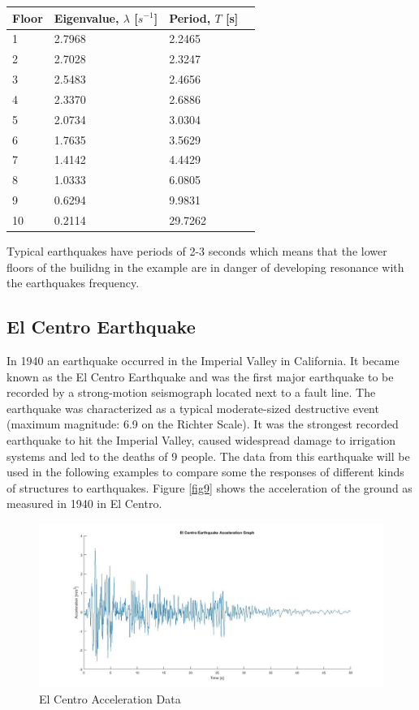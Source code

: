 \documentclass{article}
\begin{document}
				\begin{center}
    					\begin{tabular}{| l | l | l | l |}
    \hline
    Floor & Eigenvalue, $\lambda$ [$s^{-1}$] & Period, $T$ [s] \\ \hline
    1 & 2.7968 & 2.2465 \\ \hline
    2 & 2.7028 & 2.3247 \\ \hline
    3 & 2.5483 & 2.4656 \\ \hline
    4 & 2.3370 & 2.6886 \\ \hline
    5 & 2.0734 & 3.0304 \\ \hline
    6 & 1.7635 & 3.5629 \\ \hline
    7 & 1.4142 & 4.4429 \\ \hline
    8 & 1.0333 & 6.0805 \\ \hline
    9 & 0.6294 & 9.9831 \\ \hline
   10 & 0.2114 & 29.7262 \\ \hline
   					 \end{tabular}
				\end{center}
Typical earthquakes have periods of 2-3 seconds which means that the lower floors of the builidng in the example are in danger of developing resonance with the earthquakes frequency. 

	\subsection{El Centro Earthquake}
In 1940 an earthquake occurred in the Imperial Valley in California. It became known as the El Centro Earthquake and was the first major earthquake to be recorded by a strong-motion seismograph located next to a fault line. The earthquake was characterized as a typical moderate-sized destructive event (maximum magnitude: 6.9 on the Richter Scale). It was the strongest recorded earthquake to hit the Imperial Valley, caused widespread damage to irrigation systems and led to the deaths of 9 people. The data from this earthquake will be used in the following examples to compare some the responses of different kinds of structures to earthquakes. Figure \ref{fig9} shows the acceleration of the ground as measured in 1940 in El Centro. 

				\begin{figure}[h!]
   					 \centering
   					 \includegraphics[width=180mm]{pictures/ElCentro.jpg}
   					 \caption{El Centro Acceleration Data}
				            \label{fig10}
  				\end{figure}
\end{document}
